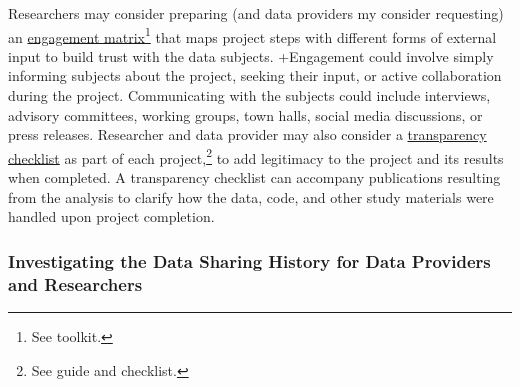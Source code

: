 \documentclass[
]{WileySix}
\begin{document}
\begin{bbox}
\begin{bbox}

Researchers may consider preparing (and data providers my consider requesting) an \href{\%5Bhttps://fpf.org/wp-content/uploads/2018/09/FPF-AISP_Nothing-to-Hide.pdf\%5D\%7B.ul\%7D}{engagement matrix}\footnote{See \citet{futureofprivacyforum2018} toolkit.} that maps project steps with different forms of external input to build trust with the data subjects. +Engagement\textbar{} could involve simply informing subjects about the project, seeking their input, or active collaboration during the project. Communicating with the subjects could include interviews, advisory committees, working groups, town halls, social media discussions, or press releases. Researcher and data provider may also consider a \href{http://www.stat.columbia.edu/~gelman/research/published/checklist.pdf}{transparency checklist} as part of each project,\footnote{See \citet{aczel2020} guide and checklist.} to add legitimacy to the project and its results when completed. A transparency checklist can accompany publications resulting from the analysis to clarify how the data, code, and other study materials were handled upon project completion.

\end{bbox}
\end{bbox}

\hypertarget{investigating-the-data-sharing-history-for-data-providers-and-researchers}{%
\subsubsection{Investigating the Data Sharing History for Data Providers and Researchers}\label{investigating-the-data-sharing-history-for-data-providers-and-researchers}}
\end{document}
